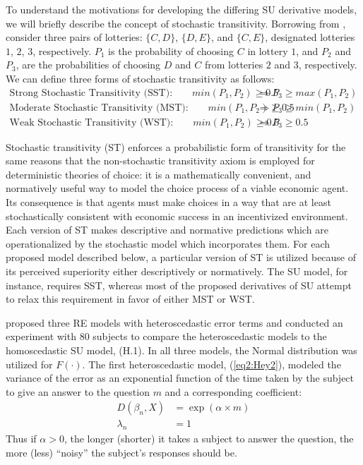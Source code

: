\documentclass[11pt,a4paper]{report}
\begin{document}
To understand the motivations for developing the differing SU derivative models, we will briefly describe the concept of stochastic transitivity.
Borrowing from \textcite[210]{Wilcox2008}, consider three pairs of lotteries: $\{C,D\}$, $\{D,E\}$, and $\{C,E\}$, designated lotteries $1$, $2$, $3$, respectively.
$P_1$ is the probability of choosing $C$ in lottery $1$, and $P_2$ and $P_3$, are the probabilities of choosing $D$ and $C$ from lotteries $2$ and $3$, respectively.
We can define three forms of stochastic transitivity as follows:
\begin{align*}
	\text{Strong Stochastic Transitivity (SST):} \qquad \mathit{min}(P_1,P_2) \geq 0.5 &\Rightarrow P_3 \geq \mathit{max}(P_1,P_2) \\
	\text{Moderate Stochastic Transitivity (MST):} \qquad \mathit{min}(P_1,P_2) \geq 0.5 &\Rightarrow P_3 \geq \mathit{min}(P_1,P_2)\\
	\text{Weak Stochastic Transitivity (WST):} \qquad \mathit{min}(P_1,P_2) \geq 0.5 &\Rightarrow P_3 \geq 0.5
\end{align*}

Stochastic transitivity (ST) enforces a probabilistic form of transitivity for the same reasons that the non-stochastic transitivity axiom is employed for deterministic theories of choice: it is a mathematically convenient, and normatively useful way to model the choice process of a viable economic agent.
Its consequence is that agents must make choices in a way that are at least stochastically consistent with economic success in an incentivized environment.
Each version of ST makes descriptive and normative predictions which are operationalized by the stochastic model which incorporates them.
For each proposed model described below, a particular version of ST is utilized because of its perceived superiority either descriptively or normatively.
The SU model, for instance, requires SST, whereas most of the proposed derivatives of SU attempt to relax this requirement in favor of either MST or WST.

\textcite{Hey1995a} proposed three RE models with heteroscedastic error terms and conducted an experiment with 80 subjects to compare the heteroscedastic models to the homoscedastic SU model, (H.1).
In all three models, the Normal distribution was utilized for $F(\cdot)$.
The first heteroscedastic model, (\ref{eq2:Hey2}), modeled the variance of the error as an exponential function of the time taken by the subject to give an answer to the question $m$ and a corresponding coefficient:
\begin{align*}
	\tag{H.2}
	\label{eq2:Hey2}
	D(\beta_n,X) &= \exp(\alpha \times m)\\
	\lambda_n &= 1
\end{align*}
Thus if $\alpha > 0$, the longer (shorter) it takes a subject to answer the question, the more (less) \enquote{noisy} the subject's responses should be.
\end{document}
